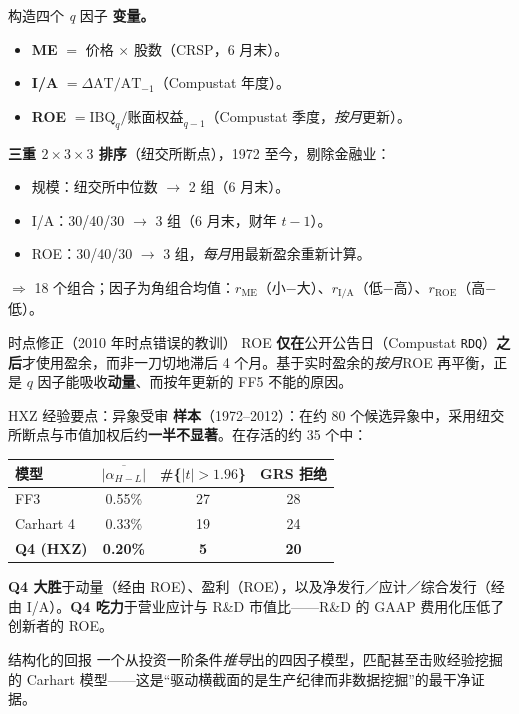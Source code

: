\documentclass{beamer}
\begin{document}
\begin{frame}{构造四个 \textit{q} 因子}
	\small
	\textbf{变量。}
	\begin{itemize}
		\item \textbf{ME} $=$ 价格 $\times$ 股数（CRSP，6 月末）。
		\item \textbf{I/A} $=\Delta\text{AT}/\text{AT}_{-1}$（Compustat 年度）。
		\item \textbf{ROE} $=\text{IBQ}_q/\text{账面权益}_{q-1}$（Compustat 季度，\textit{按月}更新）。
	\end{itemize}
	\textbf{三重 $2\times3\times3$ 排序}（纽交所断点），1972 至今，剔除金融业：
	\begin{itemize}
		\item 规模：纽交所中位数 $\to$ 2 组（6 月末）。
		\item I/A：30/40/30 $\to$ 3 组（6 月末，财年 $t-1$）。
		\item ROE：30/40/30 $\to$ 3 组，\textit{每月}用最新盈余重新计算。
	\end{itemize}
	$\Rightarrow$ 18 个组合；因子为角组合均值：$r_{\text{ME}}$（小$-$大）、$r_{\text{I/A}}$（低$-$高）、$r_{\text{ROE}}$（高$-$低）。
	\begin{block}{时点修正（2010 年时点错误的教训）}
		ROE \textbf{仅在}公开公告日（Compustat \texttt{RDQ}）\textbf{之后}才使用盈余，而非一刀切地滞后 4 个月。基于实时盈余的\textit{按月}ROE 再平衡，正是 $q$ 因子能吸收\textbf{动量}、而按年更新的 FF5 不能的原因。
	\end{block}
\end{frame}

\begin{frame}{HXZ 经验要点：异象受审}
	\small
	\textbf{样本}（1972--2012）：在约 80 个候选异象中，采用纽交所断点与市值加权后约\textbf{一半不显著}。在存活的约 35 个中：
	\begin{center}
		\footnotesize
		\begin{tabular}{lccc}
			\toprule
			模型 & $\overline{|\alpha_{H{-}L}|}$ & \#\{$|t|>1.96$\} & GRS 拒绝 \\
			\midrule
			FF3 & 0.55\% & 27 & 28 \\
			Carhart 4 & 0.33\% & 19 & 24 \\
			\textbf{Q4 (HXZ)} & \textbf{0.20\%} & \textbf{5} & \textbf{20} \\
			\bottomrule
		\end{tabular}
	\end{center}
	\textbf{Q4 大胜}于动量（经由 ROE）、盈利（ROE），以及净发行／应计／综合发行（经由 I/A）。\quad \textbf{Q4 吃力}于营业应计与 R\&D 市值比——R\&D 的 GAAP 费用化压低了创新者的 ROE。
	\begin{block}{结构化的回报}
		一个从投资一阶条件\textit{推导}出的四因子模型，匹配甚至击败经验挖掘的 Carhart 模型——这是“驱动横截面的是生产纪律而非数据挖掘”的最干净证据。
	\end{block}
\end{frame}
\end{document}
